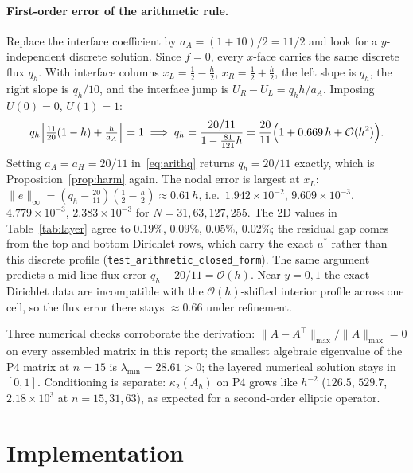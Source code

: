 \documentclass[11pt,a4paper]{article}
\begin{document}
\paragraph{First-order error of the arithmetic rule.}
Replace the interface coefficient by \(a_A=(1+10)/2=11/2\) and look for a \(y\)-independent discrete solution.
Since \(f=0\), every \(x\)-face carries the same discrete flux \(q_h\).
With interface columns \(x_L=\tfrac12-\tfrac h2\), \(x_R=\tfrac12+\tfrac h2\), the left slope is \(q_h\), the right slope is \(q_h/10\), and the interface jump is \(U_R-U_L=q_hh/a_A\).
Imposing \(U(0)=0\), \(U(1)=1\):
\begin{equation}
q_h\Bigl[\tfrac{11}{20}(1-h)+\tfrac{h}{a_A}\Bigr]=1
\;\Longrightarrow\;
q_h=\frac{20/11}{1-\tfrac{81}{121}h}=\frac{20}{11}\Bigl(1+0.669\,h+\mathcal{O}(h^2)\Bigr).
\label{eq:arithq}
\end{equation}
Setting \(a_A=a_H=20/11\) in~\eqref{eq:arithq} returns \(q_h=20/11\) exactly, which is Proposition~\ref{prop:harm} again.
The nodal error is largest at \(x_L\): \(\|e\|_\infty=(q_h-\tfrac{20}{11})(\tfrac12-\tfrac h2)\approx 0.61\,h\), i.e.\ \(1.942\times 10^{-2}\), \(9.609\times 10^{-3}\), \(4.779\times 10^{-3}\), \(2.383\times 10^{-3}\) for \(N=31,63,127,255\).
The 2D values in Table~\ref{tab:layer} agree to \(0.19\%\), \(0.09\%\), \(0.05\%\), \(0.02\%\); the residual gap comes from the top and bottom Dirichlet rows, which carry the exact \(u^*\) rather than this discrete profile (\texttt{test\_arithmetic\_closed\_form}).
The same argument predicts a mid-line flux error \(q_h-20/11=\mathcal{O}(h)\).
Near \(y=0,1\) the exact Dirichlet data are incompatible with the \(\mathcal{O}(h)\)-shifted interior profile across one cell, so the flux error there stays \(\approx 0.66\) under refinement.

Three numerical checks corroborate the derivation:
\(\|A-A^\top\|_{\max}/\|A\|_{\max}=0\) on every assembled matrix in this report;
the smallest algebraic eigenvalue of the P4 matrix at \(n=15\) is \(\lambda_{\min}=28.61>0\);
the layered numerical solution stays in \([0,1]\).
Conditioning is separate: \(\kappa_2(A_h)\) on P4 grows like \(h^{-2}\) (\(126.5\), \(529.7\), \(2.18\times 10^3\) at \(n=15,31,63\)), as expected for a second-order elliptic operator.

\section{Implementation}
\label{sec:impl}
\end{document}
